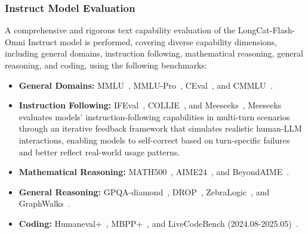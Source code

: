 \documentclass{article}
\newcommand{\longcat}{LongCat-Flash-Omni\xspace}
\begin{document}
\subsubsection{Instruct Model Evaluation}

A comprehensive and rigorous text capability evaluation of the \longcat Instruct model is performed, covering diverse capability dimensions, including general domains, instruction following, mathematical reasoning,
general reasoning, and coding, using the following benchmarks:
\begin{itemize}
    \item \textbf{General Domains:} MMLU~\citep{hendrycks2021measuringmassivemultitasklanguage}, MMLU-Pro~\citep{wang2024mmluprorobustchallengingmultitask}, CEval~\citep{huang2023ceval}, and CMMLU~\citep{li2023cmmlu}.
    \item \textbf{Instruction Following:} IFEval~\citep{zhou2023ifeval}, COLLIE~\citep{yao2024collie}, and Meeseeks~\citep{meeseeks}, Meeseeks evaluates models' instruction-following capabilities in multi-turn scenarios through an iterative feedback framework that simulates realistic human-LLM interactions, enabling models to self-correct based on turn-specific failures and better reflect real-world usage patterns.
    \item \textbf{Mathematical Reasoning:}  MATH500~\citep{math500}, AIME24~\citep{AIME24}, and BeyondAIME~\citep{bytedance_seed_2025_beyondaime}.
    \item \textbf{General Reasoning:}  GPQA-diamond~\citep{rein2023gpqagraduatelevelgoogleproofqa}, DROP~\citep{drop}, ZebraLogic~\citep{lin2025zebralogic}, and GraphWalks~\citep{graphwalks}.
    \item \textbf{Coding:}  Humaneval+~\citep{humanevalmbppplus}, MBPP+~\citep{humanevalmbppplus}, and LiveCodeBench (2024.08-2025.05)~\citep{jain2025livecodebench}.
\end{itemize}
\end{document}
